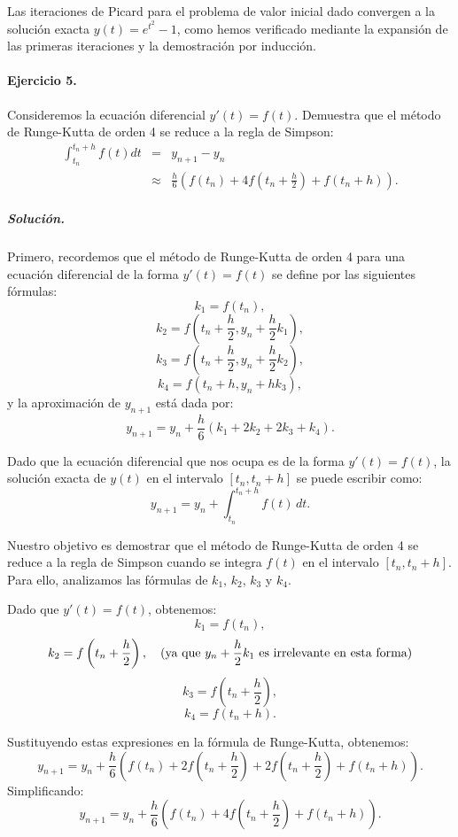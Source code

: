 \documentclass[12pt,letterpaper,oneside]{article}
\begin{document}
Las iteraciones de Picard para el problema de valor inicial dado convergen a la solución exacta \(y(t) = e^{t^2} - 1\), como hemos verificado mediante la expansión de las primeras iteraciones y la demostración por inducción.


\paragraph*{Ejercicio 5.} Consideremos la ecuación diferencial \( y'(t) = f(t) \). Demuestra que el método de Runge-Kutta de orden 4 se reduce a la regla de Simpson:
\[
\begin{array}{ccl}
\int_{t_n}^{t_n+h}f(t)dt &=& y_{n+1} - y_n \\
 &\approx & \frac{h}{6}\left(f\left(t_n \right) + 4f\left(t_n+\frac{h}{2}\right) + f\left(t_n+h\right)\right).
\end{array}
\]

\subparagraph*{Solución.}
Primero, recordemos que el método de Runge-Kutta de orden 4 para una ecuación diferencial de la forma \( y'(t) = f(t) \) se define por las siguientes fórmulas:
\[
k_1 = f(t_n),
\]
\[
k_2 = f\left(t_n + \frac{h}{2}, y_n + \frac{h}{2} k_1\right),
\]
\[
k_3 = f\left(t_n + \frac{h}{2}, y_n + \frac{h}{2} k_2\right),
\]
\[
k_4 = f\left(t_n + h, y_n + h k_3\right),
\]
y la aproximación de \(y_{n+1}\) está dada por:
\[
y_{n+1} = y_n + \frac{h}{6}(k_1 + 2k_2 + 2k_3 + k_4).
\]

Dado que la ecuación diferencial que nos ocupa es de la forma \(y'(t) = f(t)\), la solución exacta de \(y(t)\) en el intervalo \([t_n, t_n + h]\) se puede escribir como:
\[
y_{n+1} = y_n + \int_{t_n}^{t_n + h} f(t) \, dt.
\]

Nuestro objetivo es demostrar que el método de Runge-Kutta de orden 4 se reduce a la regla de Simpson cuando se integra \(f(t)\) en el intervalo \([t_n, t_n + h]\). Para ello, analizamos las fórmulas de \(k_1\), \(k_2\), \(k_3\) y \(k_4\).

Dado que \(y'(t) = f(t)\), obtenemos:
\[
k_1 = f(t_n),
\]
\[
k_2 = f\left(t_n + \frac{h}{2}\right), \quad \text{(ya que \( y_n + \frac{h}{2} k_1 \) es irrelevante en esta forma)}
\]
\[
k_3 = f\left(t_n + \frac{h}{2}\right),
\]
\[
k_4 = f(t_n + h).
\]

Sustituyendo estas expresiones en la fórmula de Runge-Kutta, obtenemos:
\[
y_{n+1} = y_n + \frac{h}{6}\left(f(t_n) + 2f\left(t_n + \frac{h}{2}\right) + 2f\left(t_n + \frac{h}{2}\right) + f(t_n + h)\right).
\]
Simplificando:
\[
y_{n+1} = y_n + \frac{h}{6}\left(f(t_n) + 4f\left(t_n + \frac{h}{2}\right) + f(t_n + h)\right).
\]
\end{document}
